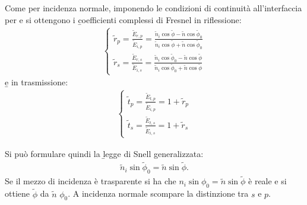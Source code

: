 Come per incidenza normale, imponendo le condizioni di continuità all'interfaccia per \dE e \dH si ottengono i \b{coefficienti complessi di Fresnel in riflessione}:
\begin{equation}\begin{split}
\begin{cases}
\widetilde r_p=\frac{\widetilde E_{r,p}}{\widetilde E_{i,p}}=\frac{\widetilde n_i\cos{\widetilde \phi}-\widetilde n\cos{\widetilde \phi_0}}{\widetilde n_i\cos{\widetilde \phi}+\widetilde n\cos{\widetilde \phi_0}}\\
\widetilde r_s=\frac{\widetilde E_{r,s}}{\widetilde E_{i,s}}=\frac{\widetilde n_i\cos{\widetilde \phi_0}-\widetilde n\cos{\widetilde \phi}}{\widetilde n_i\cos{\widetilde \phi_0}+\widetilde n\cos{\widetilde \phi}}
\end{cases}
\end{split}\end{equation}
\b{e in trasmissione}:
\begin{equation}\begin{split}
\begin{cases}
\widetilde t_p=\frac{\widetilde E_{t,p}}{\widetilde E_{i,p}}=1+\widetilde r_p\\
\widetilde t_s=\frac{\widetilde E_{t,s}}{\widetilde E_{i,s}}=1+\widetilde r_s
\end{cases}
\end{split}\end{equation}

Si può formulare quindi la \b{legge di Snell generalizzata}:
\begin{equation}\begin{split}
\widetilde n_i\sin{\widetilde \phi_0}=\widetilde n\sin{\widetilde \phi}.
\end{split}\end{equation}
Se il mezzo di incidenza è trasparente si ha che $n_i\sin{\phi_0}=\widetilde n\sin{\widetilde \phi}$ è reale e si ottiene $\widetilde \phi$ da $\widetilde n$ $\phi_0$. A incidenza normale scompare la distinzione tra $s$ e $p$.

